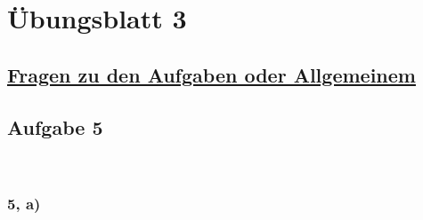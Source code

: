 


\newpage


\chapter*{Übungsblatt 3}

\newpage

\section*{\underline{Fragen zu den Aufgaben oder Allgemeinem}}

\newpage




\section*{Aufgabe 5}

~\\

\subsection*{5, a)}

~\\

%	
%	
%	
%	
	
